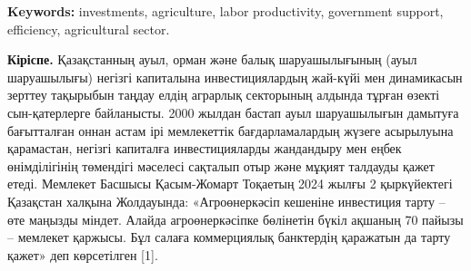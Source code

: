 {\bfseries Keywords:} investments, agriculture, labor productivity,
government support, efficiency, agricultural sector.

\begin{multicols}{2}
{\bfseries Кіріспе.} Қазақстанның ауыл, орман және балық шаруашылығының
(ауыл шаруашылығы) негізгі капиталына инвестициялардың жай-күйі мен
динамикасын зерттеу тақырыбын таңдау елдің аграрлық секторының алдында
тұрған өзекті сын-қатерлерге байланысты. 2000 жылдан бастап ауыл
шаруашылығын дамытуға бағытталған оннан астам ірі мемлекеттік
бағдарламалардың жүзеге асырылуына қарамастан, негізгі капиталға
инвестицияларды жандандыру мен еңбек өнімділігінің төмендігі мәселесі
сақталып отыр және мұқият талдауды қажет етеді. Мемлекет Басшысы
Қасым-Жомарт Тоқаетың 2024 жылғы 2 қыркүйектегі Қазақстан халқына
Жолдауында: «Агроөнеркәсіп кешеніне инвестиция тарту -- өте маңызды
міндет. Алайда агроөнеркәсіпке бөлінетін бүкіл ақшаның 70 пайызы --
мемлекет қаржысы. Бұл салаға коммерциялық банктердің қаражатын да тарту
қажет» деп көрсетілген {[}1{]}.


\end{multicols}
